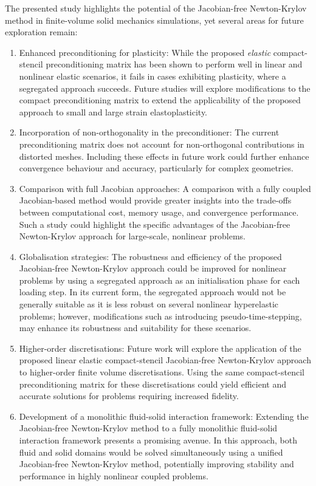 \documentclass[sn-mathphys,Numbered]{sn-jnl}%
\begin{document}
The presented study highlights the potential of the Jacobian-free Newton-Krylov method in finite-volume solid mechanics simulations, yet several areas for future exploration remain:
\begin{enumerate}
	\item{Enhanced preconditioning for plasticity}: While the proposed \emph{elastic} compact-stencil preconditioning matrix has been shown to perform well in linear and nonlinear elastic scenarios, it fails in cases exhibiting plasticity, where a segregated approach succeeds. Future studies will explore modifications to the compact preconditioning matrix to extend the applicability of the proposed approach to small and large strain elastoplasticity.

	\item{Incorporation of non-orthogonality in the preconditioner}: The current preconditioning matrix does not account for non-orthogonal contributions in distorted meshes. Including these effects in future work could further enhance convergence behaviour and accuracy, particularly for complex geometries.

	\item{Comparison with full Jacobian approaches}: A comparison with a fully coupled Jacobian-based method would provide greater insights into the trade-offs between computational cost, memory usage, and convergence performance. Such a study could highlight the specific advantages of the Jacobian-free Newton-Krylov approach for large-scale, nonlinear problems.

	\item{Globalisation strategies}: The robustness and efficiency of the proposed Jacobian-free Newton-Krylov approach could be improved for nonlinear problems by using a segregated approach as an initialisation phase for each loading step. In its current form, the segregated approach would not be generally suitable as it is less robust on several nonlinear hyperelastic problems; however, modifications such as introducing pseudo-time-stepping, may enhance its robustness and suitability for these scenarios.

	\item{Higher-order discretisations}: Future work will explore the application of the proposed linear elastic compact-stencil Jacobian-free Newton-Krylov approach to higher-order finite volume discretisations. Using the same compact-stencil preconditioning matrix for these discretisations could yield efficient and accurate solutions for problems requiring increased fidelity.

	\item{Development of a monolithic fluid-solid interaction framework}: Extending the Jacobian-free Newton-Krylov method to a fully monolithic fluid-solid interaction framework presents a promising avenue. In this approach, both fluid and solid domains would be solved simultaneously using a unified Jacobian-free Newton-Krylov method, potentially improving stability and performance in highly nonlinear coupled problems.
\end{enumerate}
\end{document}
